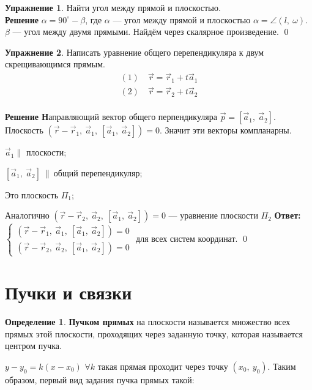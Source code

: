 \documentclass{article}
\theoremstyle{definition}
\newtheorem{definition}{Определение}
\newtheorem{exercise}{Упражнение}
\newenvironment{solution}[1]{\textbf{\\ Решение #1}}{\qed}
\begin{document}
\begin{exercise}
Найти угол между прямой и плоскостью.
\begin{solution}{}
$\alpha = 90^{\circ} - \beta$, где $\alpha$ --- угол между прямой и плоскостью $\alpha = \angle (l,\ \omega)$. $\beta$ --- угол между двумя прямыми. Найдём через скалярное произведение.
\end{solution}
\end{exercise}

\begin{exercise}
Написать уравнение общего перепендикуляра к двум скрещивающимся прямым.
$$\begin{matrix}
(1)\quad \vec r = \vec r_1 + t\vec a_1 \\
(2)\quad \vec r = \vec r_2 + t\vec a_2
\end{matrix}$$
\begin{solution}
Направляющий вектор общего перпендикуляра $\vec p = [\vec a_1,\ \vec a_2]$. Плоскость $(\vec r - \vec r_1,\ \vec a_1,\ [\vec a_1,\ \vec a_2]) = 0$. Значит эти векторы компланарны.

$\vec a_1 \parallel  $ плоскости;

$[\vec a_1,\ \vec a_2]\ \parallel\ \textrm{общий перепендикуляр}$;

Это плоскость $\Pi_1$;

Аналогично $(\vec r - \vec r_2,\ \vec a_2,\ [\vec a_1,\ \vec a_2]) = 0$ --- уравнение плоскости $\Pi_2$
\textbf{Ответ: } $\begin{cases}
(\vec r - \vec r_1,\ \vec a_1,\ [\vec a_1,\ \vec a_2]) = 0 \\
(\vec r - \vec r_2,\ \vec a_2,\ [\vec a_1,\ \vec a_2]) = 0
\end{cases}$ для всех систем координат.
\end{solution}
\end{exercise}

\section{Пучки и связки}

\begin{definition}
\textbf{Пучком прямых } на плоскости называется множество всех прямых этой плоскости, проходящих через заданную точку, которая называется центром пучка.
\end{definition}

$y - y_0 = k(x - x_0)$
$\forall k$ такая прямая проходит через точку $(x_0,\ y_0)$. Таким образом, первый вид задания пучка прямых такой:
\end{document}

